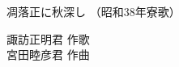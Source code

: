 \documentclass[10pt,b5j]{tarticle} %
\begin{document}
\begin{minipage}[c]{0.7\hsize} %
    \begin{center}
        {\LARGE
            凋落正に秋深し %
        }
        {\small 
            （昭和38年寮歌） %
        }
    \end{center}
\end{minipage}
\begin{minipage}[c]{0.3\hsize} %
    \begin{flushright} %
        諏訪正明君 作歌\\宮田睦彦君 作曲 %
    \end{flushright}
\end{minipage}
\end{document}
